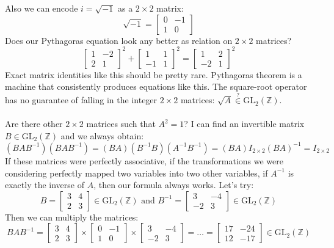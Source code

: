 \documentclass[12pt]{article}
\begin{document}
\newpage \noindent

Also we can encode $i = \sqrt{-1}$ as a $2 \times 2$ matrix:
$$ \sqrt{-1} = \left[ \begin{array}{cr} 
0 & -1 \\ 1 & 0\end{array} \right] $$
Does our Pythagoras equation look any better as relation on $2 \times 2$ matrices?
$$
\left[ \begin{array}{rr} 
1 & -2 \\ 2 & 1\end{array} \right]^2 + 
\left[ \begin{array}{rr} 
1 & 1 \\ -1 & 1\end{array} \right]^2 =
\left[ \begin{array}{rr} 
1 & 2 \\ -2 & 1\end{array} \right]^2  $$
Exact matrix identities like this should be pretty rare.  Pythagoras theorem is a machine that consistently produces equations like this. The square-root operator has no guarantee of falling in the integer $2 \times 2$ matrices: $\sqrt{A} \stackrel{?}{\in} \text{GL}_2(\mathbb{Z})$.\\ \\
Are there other $2 \times 2$ matrices such that $A^2 = 1$?  I can find an invertible matrix $B \in \text{GL}_2(\mathbb{Z})$ and we always obtain: 
$$ (BAB^{-1})(BAB^{-1}) = (BA)(B^{-1}B)(A^{-1}B^{-1}) = (BA)I_{2 \times 2}(BA)^{-1} = I_{2 \times 2} $$
If these matrices were perfectly associative, if the transformations we were considering perfectly mapped two variables into two other variables, if $A^{-1}$ is exactly the inverse of $A$, then our formula always works. Let's try:
$$B = 
\left[ \begin{array}{rr} 
3 & 4 \\ 2 & 3\end{array} \right] \in \text{GL}_2(\mathbb{Z}) \text{ and }B^{-1} = \left[ \begin{array}{rr} 
3 & -4 \\ -2 & 3\end{array} \right] \in \text{GL}_2(\mathbb{Z})
 $$
Then we can multiply the matrices:
$$ BAB^{-1} = 
\left[ \begin{array}{rr} 
3 & 4 \\ 2 & 3\end{array} \right] \times
\left[ \begin{array}{cr} 
0 & -1 \\ 1 & 0\end{array} \right] \times
\left[ \begin{array}{rr} 
3 & -4 \\ -2 & 3\end{array} \right] = \dots = 
\left[ \begin{array}{rr} 
17 & -24 \\ 12 & -17\end{array} \right]  \in \text{GL}_2(\mathbb{Z})
$$
\end{document}
